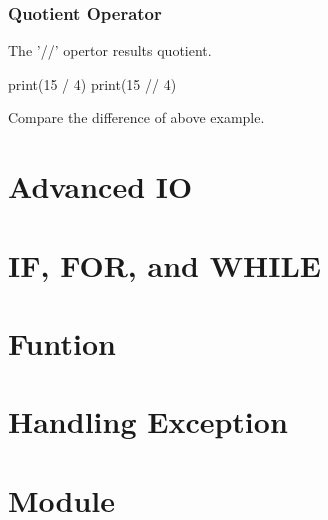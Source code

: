 \documentclass{beamer}
\begin{document}
	\begin{frame}
		\frametitle{Quotient Operator}
		The '//' opertor results quotient.
		
		\begin{example}
			print(15 / 4)
			print(15 // 4)
		\end{example}
	
		Compare the difference of above example. 
	\end{frame}

		
	\section{Advanced IO}
	
	\section{IF, FOR, and WHILE}

	\section{Funtion}
	
	\section{Handling Exception}
	
	\section{Module}
\end{document}

